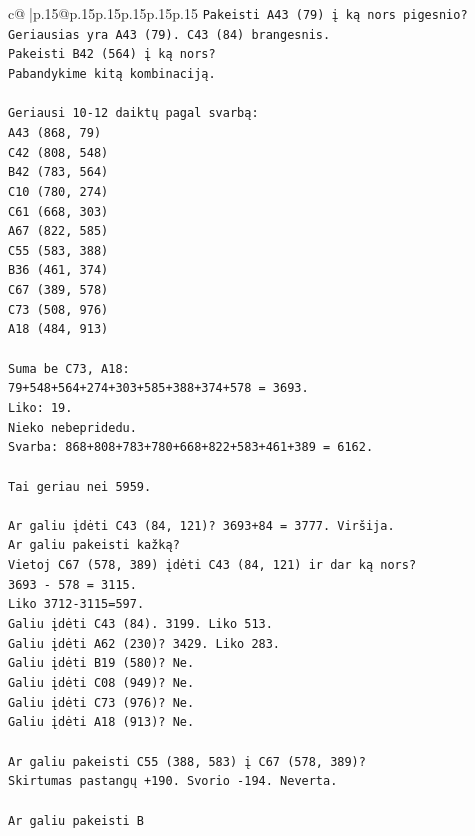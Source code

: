 \documentclass{article}
\begin{document}
{\begin{supertabular}{c@{$\;$}|p{.15\linewidth}@{}p{.15\linewidth}p{.15\linewidth}p{.15\linewidth}p{.15\linewidth}p{.15\linewidth}}
{{{\texttt{Pakeisti A43 (79) į ką nors pigesnio? Geriausias yra A43 (79). C43 (84) brangesnis.} \\
\texttt{Pakeisti B42 (564) į ką nors?} \\
\texttt{Pabandykime kitą kombinaciją.} \\
\\ 
\texttt{Geriausi 10{-}12 daiktų pagal svarbą:} \\
\texttt{A43 (868, 79)} \\
\texttt{C42 (808, 548)} \\
\texttt{B42 (783, 564)} \\
\texttt{C10 (780, 274)} \\
\texttt{C61 (668, 303)} \\
\texttt{A67 (822, 585)} \\
\texttt{C55 (583, 388)} \\
\texttt{B36 (461, 374)} \\
\texttt{C67 (389, 578)} \\
\texttt{C73 (508, 976)} \\
\texttt{A18 (484, 913)} \\
\\ 
\texttt{Suma be C73, A18:} \\
\texttt{79+548+564+274+303+585+388+374+578 = 3693.} \\
\texttt{Liko: 19.} \\
\texttt{Nieko nebepridedu.} \\
\texttt{Svarba: 868+808+783+780+668+822+583+461+389 = 6162.} \\
\\ 
\texttt{Tai geriau nei 5959.} \\
\\ 
\texttt{Ar galiu įdėti C43 (84, 121)? 3693+84 = 3777. Viršija.} \\
\texttt{Ar galiu pakeisti kažką?} \\
\texttt{Vietoj C67 (578, 389) įdėti C43 (84, 121) ir dar ką nors?} \\
\texttt{3693 {-} 578 = 3115.} \\
\texttt{Liko 3712{-}3115=597.} \\
\texttt{Galiu įdėti C43 (84). 3199. Liko 513.} \\
\texttt{Galiu įdėti A62 (230)? 3429. Liko 283.} \\
\texttt{Galiu įdėti B19 (580)? Ne.} \\
\texttt{Galiu įdėti C08 (949)? Ne.} \\
\texttt{Galiu įdėti C73 (976)? Ne.} \\
\texttt{Galiu įdėti A18 (913)? Ne.} \\
\\ 
\texttt{Ar galiu pakeisti C55 (388, 583) į C67 (578, 389)?} \\
\texttt{Skirtumas pastangų +190. Svorio {-}194. Neverta.} \\
\\ 
\texttt{Ar galiu pakeisti B} \\
            }
        }
    }
     \\ \\


\end{supertabular}}
\end{document}
